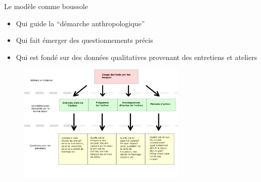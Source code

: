 \documentclass[aspectratio=169]{beamer}
\begin{document}
\begin{frame}{Le modèle  comme boussole}
    \begin{itemize}
        \item Qui guide la “démarche anthropologique” 
        \item Qui fait émerger des questionnements précis 
        \item Qui est fondé sur des données qualitatives provenant des entretiens et ateliers  
    \end{itemize}
    \begin{center}
        \vspace{-1em}
        \begin{figure}
            \centering
            \includegraphics[height = 5.7cm]{img/questionImplementation.png}
        \end{figure}
    \end{center}
\end{frame}
\end{document}
